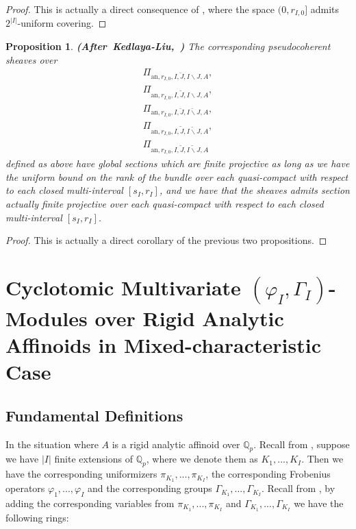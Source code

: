 \documentclass[12pt]{amsart}
\newtheorem{proposition}[theorem]{Proposition}
\theoremstyle{definition}
\numberwithin{equation}{section}
\begin{document}
\begin{proof}
This is actually a direct consequence of \cite[Proposition 2.6.17]{KL2}, where the space $(0,r_{I,0}]$ admits $2^{|I|}$-uniform covering.	
\end{proof}


\begin{proposition} \mbox{\bf{(After Kedlaya-Liu, \cite[Corollary 2.6.8, Proposition 2.6.17]{KL2})}}
The corresponding pseudocoherent sheaves over
\begin{align}
\Pi_{\mathrm{an},r_{I,0},I,\breve{J},I\backslash J,A},\\
\Pi_{\mathrm{an},r_{I,0},I,\widetilde{J},I\backslash J,A},\\
\Pi_{\mathrm{an},r_{I,0},I,\breve{J},\breve{I\backslash J},A},\\
\Pi_{\mathrm{an},r_{I,0},I,\widetilde{J},\breve{I\backslash J},A},\\
\Pi_{\mathrm{an},r_{I,0},I,\widetilde{J},\widetilde{I\backslash J},A}
\end{align}
defined as above have global sections which are finite projective as long as we have the uniform bound on the rank of the bundle over each quasi-compact with respect to each closed multi-interval $[s_I,r_I]$, and we have that the sheaves admits section actually finite projective over each quasi-compact with respect to each closed multi-interval $[s_I,r_I]$. 	
\end{proposition}


\begin{proof}
This is actually a direct corollary of the previous two propositions. 	
\end{proof}









\newpage

\section{Cyclotomic Multivariate $(\varphi_I,\Gamma_I)$-Modules over Rigid Analytic Affinoids in Mixed-characteristic Case}

\subsection{Fundamental Definitions}

\noindent In the situation where $A$ is a rigid analytic affinoid over $\mathbb{Q}_p$. Recall from \cite{T1}, suppose we have $|I|$ finite extensions of $\mathbb{Q}_p$, where we denote them as $K_1,...,K_I$. Then we have the corresponding uniformizers $\pi_{K_1},...,\pi_{K_I}$, the corresponding Frobenius operators $\varphi_1,...,\varphi_I$ and the corresponding groups $\Gamma_{K_1},...,\Gamma_{K_I}$. Recall from \cite{T1}, by adding the corresponding variables from $\pi_{K_1},...,\pi_{K_I}$ and $\Gamma_{K_1},...,\Gamma_{K_I}$ we have the following rings:
\end{document}
